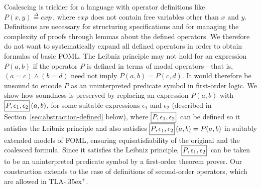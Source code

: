 \documentclass{easychair}
\newcommand{\eps}{\epsilon}
\newcommand{\tlaplus}{\mbox{TLA\kern -.35ex$^+$}\xspace}
\newcommand{\B}[1]{\framebox{\rule{0pt}{.6em}\ensuremath{\!\tlachars #1\!}}\,}
\newcommand{\edmargin}[2]{\marginpar{\raggedright\footnotesize\color{red}#1: #2}}
\newcommand{\edmargin}[2]{}
\def\llnote{\ednote{LL}}
\def\llmargin{\edmargin{LL}}
\def\ddmargin{\edmargin{DD}}
\let\tlachars\relax
\newcommand{\deq}{\mathrel{\stackrel{\scriptscriptstyle\Delta}{=}}}
\begin{document}
Coalescing is trickier for a language with
operator definitions like
%
  \,\,$P(x,y) \deq exp$\,,
%
where $exp$ does not contain free variables other than $x$ and $y$.
Definitions are necessary for structuring specifications and for
managing the complexity of proofs through lemmas about the defined
operators.  We therefore do not want to systematically expand all
defined operators in order to obtain formulas of basic FOML. The
Leibniz principle may not hold for an expression $P(a, b)$ if the
operator $P$ is defined in terms of modal operators---that is,
$(a=c) \land (b=d)$ need not imply
  $P(a,b)=P(c,d)$.  It would
therefore be unsound to encode $P$ as an uninterpreted predicate
symbol in first-order logic.  We show how soundness is preserved
by replacing an expression $P(a,b)$ with $\B{P,\eps_1,\eps_2}(a,b)$,
for some suitable expressions $\eps_1$ and $\eps_2$ (described 
in Section~\ref{sec:abstraction-defined} below),
where $\B{P,\eps_1,\eps_2}$ can be defined so it
satisfies the Leibniz
principle and also satisfies
\(
  \B{P,\eps_1,\eps_2}(a,b) = P(a,b)
\)
in suitably extended models of FOML, ensuring equisatisfiability of the original
and the coalesced formula.
Since it satisfies the Leibniz principle,
$\B{P,\eps_1,\eps_2}$ can be taken to be an uninterpreted
predicate symbol by a first-order theorem prover.
Our construction extends to the
case of definitions of second-order operators, which are allowed in \tlaplus.


%


\end{document}
